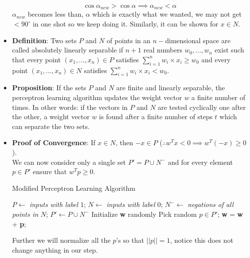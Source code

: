 \documentclass[a4paper]{article}
\begin{document}
\begin{itemize}
\begin{equation*}
    \end{equation*}
    \begin{equation*}
        \cos{\alpha_{new}}>\cos{\alpha}\implies \alpha_{new}<\alpha
    \end{equation*}
    $\alpha_{new}$ becomes less than, $\alpha$ which is exactly what we wanted, we may not get $<90^{\circ}$ in one shot so we keep doing it. Similarly, it can be shown for $x\in N$.
    \item \textbf{Definition}: Two sets $P$ and $N$ of points in an $n-$dimensional space are called absolutely linearly separable if $n+1$ real numbers $w_0,...,w_n$ exist such that every point $(x_1,...,x_n)\in P$ satisfies $\sum_{i=1}^nw_i\times x_i\geq w_0$ and every point $(x_1,...,x_n)\in N$ satisfies $\sum_{i=1}^nw_i\times x_i<w_0$.
    \item \textbf{Proposition}: If the sets $P$ and $N$ are finite and linearly separable, the perceptron learning algorithm updates the weight vector $w$ a finite number of times. In other words: if the vectors in $P$ and $N$ are tested cyclically one after the other, a weight vector $w$ is found after a finite number of steps $t$ which can separate the two sets.
    \item \textbf{Proof of Convergence}: If $x\in N$, then $-x\in P$ ($\therefore w^Tx<0\implies w^T(-x)\geq 0$).\\
    We can now consider only a single set $P'=P\cup N^-$ and for every element $p\in P'$ ensure that $w^Tp\geq 0$.
    \begin{algorithm}[H]
        \caption{Modified Perceptron Learning Algorithm}\label{alg:DL-modified-perceptron-learning-alg}
        \begin{algorithmic}[1]
            \State $P\gets$ \textit{inputs with label }$1$;
            \State $N\gets$ \textit{inputs with label }$0$;
            \State $N^-\gets$ \textit{negations of all points in }$N$;
            \State $P'\gets P\cup N^-$
            \State Initialize \textbf{w} randomly
                \State Pick random $p\in P'$;
                    \State \textbf{w} = \textbf{w} + \textbf{p};
                \EndIf
            \EndWhile
        \end{algorithmic}
    \end{algorithm}
    Further we will normalize all the $p$'s so that $||p||=1$, notice this does not change anything in our step.\\

\end{itemize}
\end{document}
